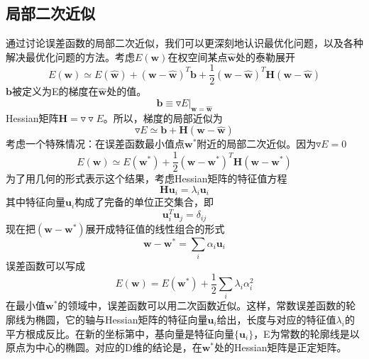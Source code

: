 \subsection*{局部二次近似}
通过讨论误差函数的局部二次近似，我们可以更深刻地认识最优化问题，以及各种解决最优化问题的方法。考虑$E(\boldsymbol{w})$在权空间某点$\hat{\boldsymbol{w}}$处的泰勒展开 
\begin{equation}
	E(\boldsymbol{w})\simeq E(\hat{\boldsymbol{w}})+(\boldsymbol{w}-\hat{\boldsymbol{w}})^T\boldsymbol{b}+\frac{1}{2}(\boldsymbol{w}-\hat{\boldsymbol{w}})^T\boldsymbol{H}(\boldsymbol{w}-\hat{\boldsymbol{w}})
\end{equation}
$\boldsymbol{b}$被定义为E的梯度在$\hat{\boldsymbol{w}}$处的值。
\begin{equation}
	\boldsymbol{b}\equiv \triangledown E|_{\boldsymbol{w}=\hat{\boldsymbol{w}}}
\end{equation}
Hessian矩阵$\boldsymbol{H}=\triangledown\triangledown E$。所以，梯度的局部近似为
\begin{equation}
	\triangledown E\simeq \boldsymbol{b}+\boldsymbol{H}(\boldsymbol{w}-\hat{\boldsymbol{w}})
\end{equation}
考虑一个特殊情况：在误差函数最小值点$\boldsymbol{w}^*$附近的局部二次近似。因为$\triangledown E=0$
\begin{equation}
E(\boldsymbol{w})\simeq E(\boldsymbol{w}^*)+\frac{1}{2}(\boldsymbol{w}-\boldsymbol{w}^*)^T\boldsymbol{H}(\boldsymbol{w}-\boldsymbol{w}^*)
\end{equation}
为了用几何的形式表示这个结果，考虑Hessian矩阵的特征值方程
\begin{equation}
	\boldsymbol{H} \boldsymbol{u}_i=\lambda_i\boldsymbol{u}_i
\end{equation}
其中特征向量$\boldsymbol{u}_i$构成了完备的单位正交集合，即
\begin{equation}
	\boldsymbol{u}_i^T\boldsymbol{u}_j=\delta_{ij}
\end{equation}
现在把$(\boldsymbol{w}-\boldsymbol{w}^*)$展开成特征值的线性组合的形式
\begin{equation}
	\boldsymbol{w}-\boldsymbol{w}^*=\sum_i \alpha_i \boldsymbol{u}_i
\end{equation}
误差函数可以写成
\begin{equation}
	E(\boldsymbol{w})=E(\boldsymbol{w}^*)+\frac{1}{2}\sum_i \lambda_i\alpha_i^2
\end{equation}
在最小值$\boldsymbol{w}^*$的领域中，误差函数可以用二次函数近似。这样，常数误差函数的轮廓线为椭圆，它的轴与Hessian矩阵的特征向量$\boldsymbol{u}_i$给出，长度与对应的特征值$\lambda_i$的平方根成反比。在新的坐标第中，基向量是特征向量$\{\boldsymbol{u}_i\}$，E为常数的轮廓线是以原点为中心的椭圆。对应的D维的结论是，在$\boldsymbol{w}^*$处的Hessian矩阵是正定矩阵。
